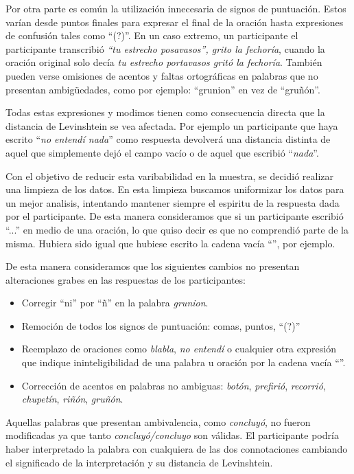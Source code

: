 Por otra parte es común la utilización innecesaria de signos de puntuación. Estos varían desde puntos finales para expresar el final de la oración hasta expresiones de confusión tales como ``(?)''. En un caso extremo, un participante el participante transcribió \textit{``tu estrecho posavasos'', grito la fechoría}, cuando la oración original solo decía \textit{tu estrecho portavasos gritó la fechoría}.
También pueden verse omisiones de acentos y faltas ortográficas en palabras que no presentan ambigüedades, como por ejemplo: ``grunion'' en vez de ``gruñón''.

Todas estas expresiones y modimos tienen como consecuencia directa que la distancia de Levinshtein se vea afectada. Por ejemplo un participante que haya escrito ``\textit{no entendí nada}'' como respuesta devolverá una distancia distinta de aquel que simplemente dejó el campo vacío o de aquel que escribió ``\textit{nada}''.

Con el objetivo de reducir esta varibabilidad en la muestra, se decidió realizar una limpieza de los datos. En esta limpieza buscamos uniformizar los datos para un mejor analisis, intentando mantener siempre el espiritu de la respuesta dada por el participante. De esta manera consideramos que si un participante escribió ``...'' en medio de una oración, lo que quiso decir es que no comprendió parte de la misma. Hubiera sido igual que hubiese escrito la cadena vacía ``'', por ejemplo.

De esta manera consideramos que los siguientes cambios no presentan alteraciones grabes en las respuestas de los participantes:

\begin{itemize}
	\item Corregir ``ni'' por ``ñ'' en la palabra \textit{grunion}.
	\item Remoción de todos los signos de puntuación: comas, puntos, ``(?)''
	\item Reemplazo de oraciones como \textit{blabla}, \textit{no entendí} o cualquier otra expresión que indique ininteligibilidad de una palabra u oración por la cadena vacía ``''.
	\item Corrección de acentos en palabras no ambiguas: \textit{botón}, \textit{prefirió}, \textit{recorrió}, \textit{chupetín}, \textit{riñón}, \textit{gruñón}.
\end{itemize}

Aquellas palabras que presentan ambivalencia, como \textit{concluyó}, no fueron modificadas ya que tanto \textit{concluyó/concluyo} son válidas. El participante podría haber interpretado la palabra con cualquiera de las dos connotaciones cambiando el significado de la interpretación y su distancia de Levinshtein.

